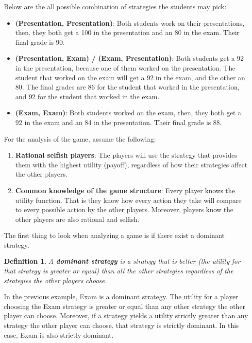 \documentclass[twoside]{article}
\newtheorem{definition}[theorem]{Definition}
\begin{document}
Below are the all possible combination of strategies the students may pick:

\begin{itemize}
  \item \textbf{(Presentation, Presentation)}: Both students work on their presentations, then, they both get a 100 in the presentation and an 80 in the exam. Their final grade is 90.
  
  \item \textbf{(Presentation, Exam) / (Exam, Presentation)}: Both students get a 92 in the presentation, because one of them worked on the presentation. The student that worked on the exam will get a 92 in the exam, and the other an 80. The final grades are 86 for the student that worked in the presentation, and 92 for the student that worked in the exam.
  
  \item \textbf{(Exam, Exam)}: Both students worked on the exam, then, they both get a 92 in the exam and an 84 in the presentation. Their final grade is 88.
\end{itemize}

For the analysis of the game, assume the following:

\begin{enumerate}
  \item \textbf{Rational selfish players}: The players will use the strategy that provides them with the highest utility (payoff), regardless of how their strategies affect the other players.
  
  \item \textbf{Common knowledge of the game structure}: Every player knows the utility function. That is they know how every action they take will compare to every possible action by the other players. Moreover, players know the other players are also rational and selfish.
\end{enumerate}

The first thing to look when analyzing a game is if there exist a dominant strategy.

\begin{definition}
A \textbf{dominant strategy} is a strategy that is better (the utility for that strategy is greater or equal) than all the other strategies regardless of the strategies the other players choose.
\end{definition}

In the previous example, Exam is a dominant strategy. The utility for a player choosing the Exam strategy is greater or equal than any other strategy the other player can choose. Moreover, if a strategy yields a utility strictly greater than any strategy the other player can choose, that strategy is strictly dominant. In this case, Exam is also strictly dominant.
\end{document}
